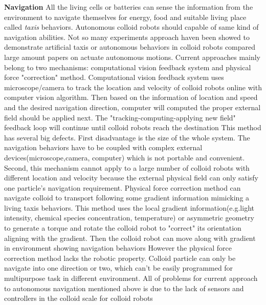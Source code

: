 \textbf{Navigation} All the living cells or batteries can sense the information from the environment to navigate themselves for energy, food and suitable living place called \textit{taxis} behaviors. Autonomous colloid robots should capable of same kind of navigation abilities. Not so many experiments approach haven been showed to demonstrate  artificial taxis or autonomous behaviors in colloid robots compared large amount papers on actuate autonomous motions. Current approaches mainly belong to two mechanisms:  computational vision feedback system and physical force "correction" method. Computational vision feedback system uses microscope/camera to track the location and velocity of colloid robots online with computer vision algorithm. Then based on the information of location and speed and the desired navigation direction, computer will computed the proper external field should be applied next. The "tracking-computing-applying new field" feedback loop will continue until colloid robots reach the destination\cite{li2017autonomous,han2017sequence} This method has several big defects. First disadvantage is the size of the whole system. The navigation behaviors have to be coupled with complex external devices(microscope,camera, computer) which is not portable and convenient. Second, this mechanism cannot apply to a large number of colloid robots with different location and velocity because the external physical field can only satisfy one particle's navigation requirement. Physical force correction method can navigate  colloid to transport following  some gradient information mimicking a living taxis behaviors. This method uses the local gradient information(e.g.light intensity, chemical species concentration, temperature) or asymmetric geometry to generate a torque and rotate  the colloid robot to "correct" its orientation aligning with the gradient. Then the colloid robot can move along with gradient in environment showing navigation behaviors \cite{brosseau2019relating,ten2014gravitaxis,lozano2016phototaxis,baker2019fight} However the physical force correction method  lacks the robotic property. Colloid particle can only be navigate into one direction or two, which can't be easily programmed for multipurpose task in different environment. All of problems for current approach to autonomous navigation mentioned above is due to the lack of sensors and controllers in the colloid scale for colloid robots





